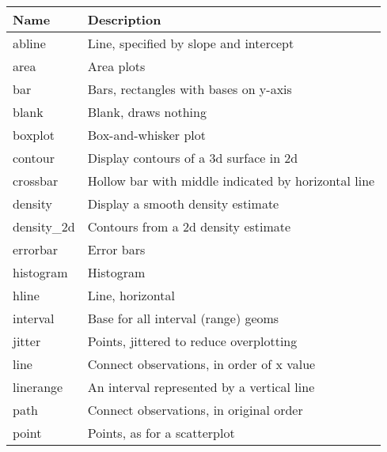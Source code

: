 \begin{table}
  \begin{center}
 \begin{tabular}{lp{3in}}
  \toprule
  Name & Description \\
  \midrule
  abline       & Line, specified by slope and intercept                                       \\
  area         & Area plots                                                                   \\
  bar          & Bars, rectangles with bases on y-axis                                        \\
  blank        & Blank, draws nothing                                                         \\
  boxplot      & Box-and-whisker plot                                                        \\
  contour      & Display contours of a 3d surface in 2d                                       \\
  crossbar     & Hollow bar with middle indicated by horizontal line                          \\
  density      & Display a smooth density estimate                                            \\
  density\_2d & Contours from a 2d density estimate                                          \\
  errorbar     & Error bars                                                                   \\
  histogram    & Histogram                                                                    \\
  hline        & Line, horizontal                                                             \\
  interval     & Base for all interval (range) geoms                                          \\
  jitter       & Points, jittered to reduce overplotting                                      \\
  line         & Connect observations, in order of x value                                  \\
  linerange    & An interval represented by a vertical line                                   \\
  path         & Connect observations, in original order                                      \\
  point        & Points, as for a scatterplot                                                 \\

\end{tabular}
\end{center}
\end{table}
